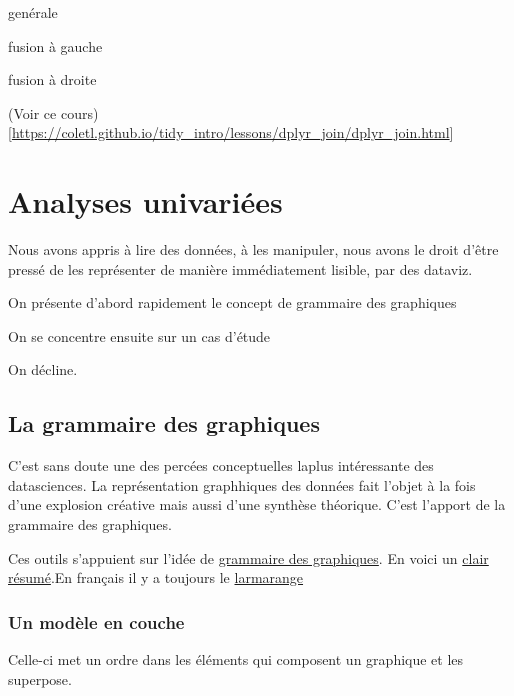 \documentclass[
]{book}
\begin{document}
genérale

fusion à gauche

fusion à droite

(Voir ce cours){[}\url{https://coletl.github.io/tidy_intro/lessons/dplyr_join/dplyr_join.html}{]}

\hypertarget{analyses-univariuxe9es}{%
\chapter{Analyses univariées}\label{analyses-univariuxe9es}}

Nous avons appris à lire des données, à les manipuler, nous avons le droit d'être pressé de les représenter de manière immédiatement lisible, par des dataviz.

On présente d'abord rapidement le concept de grammaire des graphiques

On se concentre ensuite sur un cas d'étude

On décline.

\hypertarget{la-grammaire-des-graphiques}{%
\section{La grammaire des graphiques}\label{la-grammaire-des-graphiques}}

C'est sans doute une des percées conceptuelles laplus intéressante des datasciences. La représentation graphhiques des données fait l'objet à la fois d'une explosion créative mais aussi d'une synthèse théorique. C'est l'apport de la grammaire des graphiques.

Ces outils s'appuient sur l'idée de \href{https://www.goodreads.com/book/show/2549408.The_Grammar_of_Graphics}{grammaire des graphiques}. En voici un \href{https://cfss.uchicago.edu/notes/grammar-of-graphics/}{clair résumé}.En français il y a toujours le \href{http://larmarange.github.io/analyse-R/intro-ggplot2.html}{larmarange}

\hypertarget{un-moduxe8le-en-couche}{%
\subsection{Un modèle en couche}\label{un-moduxe8le-en-couche}}

Celle-ci met un ordre dans les éléments qui composent un graphique et les superpose.
\end{document}

